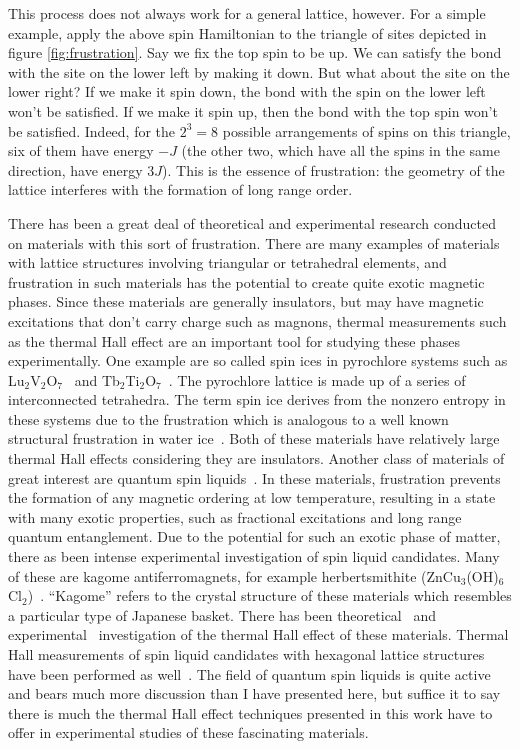 \documentclass{thesis-umich}
\begin{document}
This process does not always work for a general lattice, however. For a simple example, apply the above spin Hamiltonian to the triangle of sites depicted in figure \ref{fig:frustration}. Say we fix the top spin to be up. We can satisfy the bond with the site on the lower left by making it down. But what about the site on the lower right? If we make it spin down, the bond with the spin on the lower left won't be satisfied. If we make it spin up, then the bond with the top spin won't be satisfied. Indeed, for the $2^3 = 8$ possible arrangements of spins on this triangle, six of them have energy $-J$ (the other two, which have all the spins in the same direction, have energy $3J$). This is the essence of frustration: the geometry of the lattice interferes with the formation of long range order.

There has been a great deal of theoretical and experimental research conducted on materials with this sort of frustration. There are many examples of materials with lattice structures involving triangular or tetrahedral elements, and frustration in such materials has the potential to create quite exotic magnetic phases. Since these materials are generally insulators, but may have magnetic excitations that don't carry charge such as magnons, thermal measurements such as the thermal Hall effect are an important tool for studying these phases experimentally. One example are so called spin ices in pyrochlore systems such as Lu$_2$V$_2$O$_7$~\cite{Onose2010} and Tb$_2$Ti$_2$O$_7$~\cite{Hirschberger2015}. The pyrochlore lattice is made up of a series of interconnected tetrahedra. The term spin ice derives from the nonzero entropy in these systems due to the frustration which is analogous to a well known structural frustration in water ice~\cite{Giauque1936}. Both of these materials have relatively large thermal Hall effects considering they are insulators. Another class of materials of great interest are quantum spin liquids~\cite{Anderson1973}. In these materials, frustration prevents the formation of any magnetic ordering at low temperature, resulting in a state with many exotic properties, such as fractional excitations and long range quantum entanglement. Due to the potential for such an exotic phase of matter, there as been intense experimental investigation of spin liquid candidates. Many of these are kagome antiferromagnets, for example herbertsmithite (ZnCu$_3$(OH)$_6$Cl$_2$)~\cite{Asaba2014}. ``Kagome'' refers to the crystal structure of these materials which resembles a particular type of Japanese basket. There has been theoretical~\cite{Owerre2017} and experimental~\cite{Doki2018} investigation of the thermal Hall effect of these materials. Thermal Hall measurements of spin liquid candidates with hexagonal lattice structures have been performed as well~\cite{Kasahara2018}. The field of quantum spin liquids is quite active and bears much more discussion than I have presented here, but suffice it to say there is much the thermal Hall effect techniques presented in this work have to offer in experimental studies of these fascinating materials.
\end{document}
